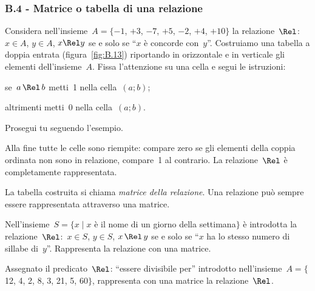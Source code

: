 \begin{multicols}{2}
 \subsubsection*{B.4 - Matrice o tabella di una relazione}

\begin{esercizio}
\label{ese:B.9}
Considera nell'insieme~$A = \{-1$, $+3$, $-7$, $+5$, $-2$, $+4$, $+10\}$ la relazione~$\Rel$:~$x \in A$, $y \in A$, $x \Rel y$ se e solo se ``$x$
è concorde con~$y$''. Costruiamo una tabella a doppia entrata (figura~\ref{fig:B.13}) riportando in orizzontale e in verticale gli elementi dell'insieme~$A$.
Fissa l'attenzione su una cella e segui le istruzioni:
\begin{itemize*}
\item se~$a \,\Rel\, b$ metti~1 nella cella~$(a;b)$;
\item altrimenti metti~0 nella cella~$(a;b)$.
\end{itemize*}
Prosegui tu seguendo l'esempio.
\end{esercizio}

\osservazione Alla fine tutte le celle sono riempite: compare zero se gli elementi della coppia ordinata non sono in relazione, compare~1 al contrario.
La relazione~$\Rel$ è completamente rappresentata.

La tabella costruita si chiama \emph{matrice della relazione}.
Una relazione può sempre essere rappresentata attraverso una matrice.

\begin{esercizio}
\label{ese:B.10}
Nell'insieme~$S = \{ x \mid  x$ è il nome di un giorno della settimana$\}$ è introdotta la relazione~$\Rel$:~$x \in S$, $y \in S$, $x \,\Rel\, y$
se e solo se ``$x$ ha lo stesso numero di sillabe di~$y$''. Rappresenta la relazione con una matrice.
\end{esercizio}

\begin{esercizio}
\label{ese:B.11}
Assegnato il predicato~$\Rel$: ``essere divisibile per'' introdotto nell'insieme~$A =\{$12, 4, 2, 8, 3, 21, 5, 60$\}$, rappresenta con una matrice la relazione~$\Rel$.
\end{esercizio}

\end{multicols}

